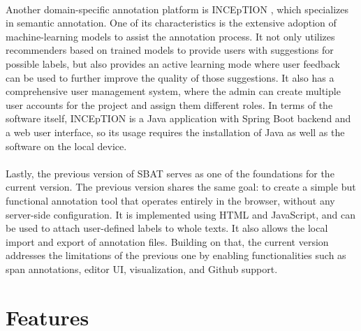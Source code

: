 \documentclass[12ptm a4paper]{article}
\begin{document}
\\
Another domain-specific annotation platform is INCEpTION \citep{klie-etal-2018-inception}, which specializes in semantic annotation. One of its characteristics is the extensive adoption of machine-learning models to assist the annotation process. It not only utilizes recommenders based on trained models to provide users with suggestions for possible labels, but also provides an active learning mode where user feedback can be used to further improve the quality of those suggestions. It also has a comprehensive user management system, where the admin can create multiple user accounts for the project and assign them different roles. In terms of the software itself, INCEpTION is a Java application with Spring Boot backend and a web user interface, so its usage requires the installation of Java as well as the software on the local device.\\
\\
Lastly, the previous version of SBAT \citep{SBAT} serves as one of the foundations for the current version. The previous version shares the same goal: to create a simple but functional annotation tool that operates entirely in the browser, without any server-side configuration. It is implemented using HTML and JavaScript, and can be used to attach user-defined labels to whole texts. It also allows the local import and export of annotation files. Building on that, the current version addresses the limitations of the previous one by enabling functionalities such as span annotations, editor UI, visualization, and Github support.
\newpage
\section{Features}
\end{document}
